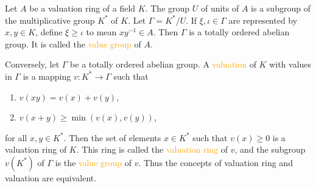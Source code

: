 \begin{definition}
	Let $A$ be a valuation ring of a field $K$. The group $U$ of units of $A$ is a subgroup of the multiplicative group $K^*$ of $K$. Let $\Gamma=K^*/U$. If $\xi,\iota\in\Gamma$ are represented by $x,y\in K$, define $\xi\geqslant\iota$ to mean $xy^{-1}\in A$. Then $\Gamma$ is a totally ordered abelian group. It is called the \textcolor{orange}{value group} of $A$.
	
	Conversely, let $\Gamma$ be a totally ordered abelian group. A \textcolor{orange}{valuation} of $K$ with values in $\Gamma$ is a mapping $v:K^*\rightarrow\Gamma$ such that
	\begin{enumerate}[label=\textup{(\arabic*)}]
		\item $v(xy)=v(x)+v(y)$,
		\item $v(x+y)\geqslant\operatorname{min}(v(x),v(y))$,
	\end{enumerate}
	for all $x,y\in K^*$. Then the set of elements $x\in K^*$ such that $v(x)\geqslant0$ is a valuation ring of $K$. This ring is called the \textcolor{orange}{valuation ring} of $v$, and the subgroup $v(K^*)$ of $\Gamma$ is the \textcolor{orange}{value group} of $v$. Thus the concepts of valuation ring and valuation are equivalent.
\end{definition}